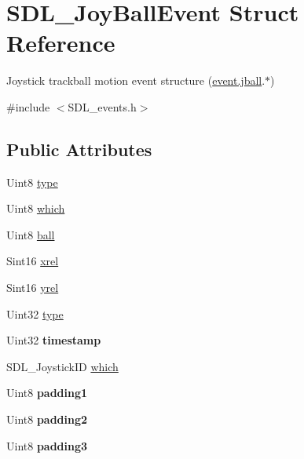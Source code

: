 \hypertarget{structSDL__JoyBallEvent}{\section{S\+D\+L\+\_\+\+Joy\+Ball\+Event Struct Reference}
\label{structSDL__JoyBallEvent}
}


Joystick trackball motion event structure (\hyperlink{unionSDL__Event_ae433f511e3383d17f8fe02df745ee8f8}{event.\+jball}.$\ast$)  




{\ttfamily \#include $<$S\+D\+L\+\_\+events.\+h$>$}

\subsection*{Public Attributes}
\begin{DoxyCompactItemize}
\item 
Uint8 \hyperlink{structSDL__JoyBallEvent_a0b192b95a043cb494b27ed9b27e84db1}{type}
\item 
Uint8 \hyperlink{structSDL__JoyBallEvent_a4e2e185717d529167cd0bea21093c454}{which}
\item 
Uint8 \hyperlink{structSDL__JoyBallEvent_add4eb0daeaf95ae56e8c7cfcec560242}{ball}
\item 
Sint16 \hyperlink{structSDL__JoyBallEvent_a959a8473aa1964e5e1778c27a9ffd261}{xrel}
\item 
Sint16 \hyperlink{structSDL__JoyBallEvent_a28ad48a9eb7a5d3ff62ccba09fcead76}{yrel}
\item 
Uint32 \hyperlink{structSDL__JoyBallEvent_a0b192b95a043cb494b27ed9b27e84db1}{type}
\item 
\hypertarget{structSDL__JoyBallEvent_aa8e4fb91af62e316bb9a3219ab76148d}{Uint32 {\bfseries timestamp}}\label{structSDL__JoyBallEvent_aa8e4fb91af62e316bb9a3219ab76148d}

\item 
S\+D\+L\+\_\+\+Joystick\+I\+D \hyperlink{structSDL__JoyBallEvent_a4e2e185717d529167cd0bea21093c454}{which}
\item 
\hypertarget{structSDL__JoyBallEvent_aff75a6519ca2a19cffdc14ebf4626613}{Uint8 {\bfseries padding1}}\label{structSDL__JoyBallEvent_aff75a6519ca2a19cffdc14ebf4626613}

\item 
\hypertarget{structSDL__JoyBallEvent_a0ea3071b99ac096b0157714f01ff04f8}{Uint8 {\bfseries padding2}}\label{structSDL__JoyBallEvent_a0ea3071b99ac096b0157714f01ff04f8}

\item 
\hypertarget{structSDL__JoyBallEvent_acb700712f1a4070bc114ef9d55b00640}{Uint8 {\bfseries padding3}}\label{structSDL__JoyBallEvent_acb700712f1a4070bc114ef9d55b00640}

\end{DoxyCompactItemize}


